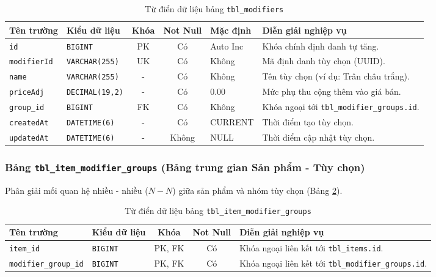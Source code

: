 \begin{table}[htbp]
\centering
\caption{Từ điển dữ liệu bảng \texttt{tbl\_modifiers}}
\label{tab:tbl_modifiers}
\vspace{2mm}
\begin{tabularx}{\textwidth}{|p{2.5cm}|p{2.8cm}|c|c|p{1.8cm}|X|}
\hline
\textbf{Tên trường} & \textbf{Kiểu dữ liệu} & \textbf{Khóa} & \textbf{Not Null} & \textbf{Mặc định} & \textbf{Diễn giải nghiệp vụ} \\ \hline
\texttt{id} & \texttt{BIGINT} & PK & Có & Auto Inc & Khóa chính định danh tự tăng. \\ \hline
\texttt{modifierId} & \texttt{VARCHAR(255)} & UK & Có & Không & Mã định danh tùy chọn (UUID). \\ \hline
\texttt{name} & \texttt{VARCHAR(255)} & - & Có & Không & Tên tùy chọn (ví dụ: Trân châu trắng). \\ \hline
\texttt{priceAdj} & \texttt{DECIMAL(19,2)} & - & Có & 0.00 & Mức phụ thu cộng thêm vào giá bán. \\ \hline
\texttt{group\_id} & \texttt{BIGINT} & FK & Có & Không & Khóa ngoại tới \texttt{tbl\_modifier\_groups.id}. \\ \hline
\texttt{createdAt} & \texttt{DATETIME(6)} & - & Có & CURRENT & Thời điểm tạo tùy chọn. \\ \hline
\texttt{updatedAt} & \texttt{DATETIME(6)} & - & Không & NULL & Thời điểm cập nhật tùy chọn. \\ \hline
\end{tabularx}
\end{table}

\subsubsection{Bảng \texttt{tbl\_item\_modifier\_groups} (Bảng trung gian Sản phẩm - Tùy chọn)}
Phân giải mối quan hệ nhiều - nhiều ($N-N$) giữa sản phẩm và nhóm tùy chọn (Bảng \ref{tab:tbl_item_mod}).

\begin{table}[htbp]
\centering
\caption{Từ điển dữ liệu bảng \texttt{tbl\_item\_modifier\_groups}}
\label{tab:tbl_item_mod}
\vspace{2mm}
\begin{tabularx}{\textwidth}{|p{3.5cm}|p{2.8cm}|c|c|X|}
\hline
\textbf{Tên trường} & \textbf{Kiểu dữ liệu} & \textbf{Khóa} & \textbf{Not Null} & \textbf{Diễn giải nghiệp vụ} \\ \hline
\texttt{item\_id} & \texttt{BIGINT} & PK, FK & Có & Khóa ngoại liên kết tới \texttt{tbl\_items.id}. \\ \hline
\texttt{modifier\_group\_id} & \texttt{BIGINT} & PK, FK & Có & Khóa ngoại liên kết tới \texttt{tbl\_modifier\_groups.id}. \\ \hline
\end{tabularx}
\end{table}


